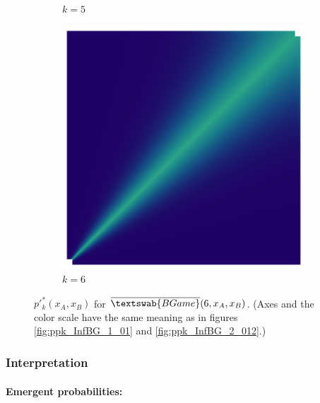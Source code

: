 \documentclass{article}
\theoremstyle{definition}
\newcommand{\InfBG}[1]{$\overline{\textswab{BGame}}(#1)$}
\begin{document}
\begin{figure}[H]
\begin{subfigure}[b]{0.130\textwidth}
        \caption{$k=5$}
        \label{fig:ppkBG_6_5}
    \end{subfigure}
    \hspace{0.00\textwidth} %
        \begin{subfigure}[b]{0.130\textwidth}
        \includegraphics[width=\textwidth]{img/BinomialBayesian_ppk_6_6.png}
        \caption{$k=6$}
        \label{fig:ppkBG_6_6}
    \end{subfigure}
    \hspace{0.00\textwidth} %
    
    \caption{$p'^*_k(x_A,x_B)$ for \InfBG{6,x_A,x_B}.
    (Axes and the color scale have the same meaning as in figures \ref{fig:ppk_InfBG_1_01} and \ref{fig:ppk_InfBG_2_012}.)
    }
    \label{fig:ppk_InfBG_6_0123456}
\end{figure}



\subsubsection{Interpretation}

\paragraph{Emergent probabilities:}
\end{document}
